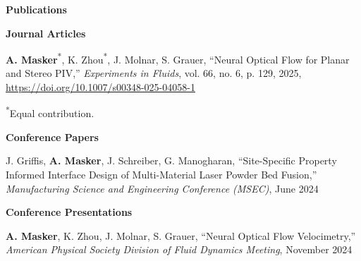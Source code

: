 \begin{center}
    \textbf{Publications}
\end{center}

\vspace*{.05in}
\textbf{Journal Articles}\vspace*{.05in}
\renewcommand{\theenumi}{J\arabic{enumi}}
\begin{etaremune}[leftmargin=18.5pt]
    \item \textbf{A. Masker}\textsuperscript{*}, K. Zhou\textsuperscript{*}, J. Molnar, S. Grauer, ``Neural Optical Flow for Planar and Stereo PIV,'' \textit{Experiments in Fluids}, vol. 66, no. 6, p. 129, 2025, \url{https://doi.org/10.1007/s00348-025-04058-1}
\end{etaremune}
{\small \textsuperscript{*}Equal contribution.}

\vspace{12pt}

\textbf{Conference Papers}\vspace*{.05in}
\renewcommand{\theenumi}{C\arabic{enumi}}
\begin{etaremune}[leftmargin=18.5pt]
    \item J. Griffis, \textbf{A. Masker}, J. Schreiber, G. Manogharan, ``Site-Specific Property Informed Interface Design of Multi-Material Laser Powder Bed Fusion,'' \textit{Manufacturing Science and Engineering Conference (MSEC)}, June 2024
\end{etaremune}

\vspace{12pt}

\textbf{Conference Presentations}\vspace*{.05in}
\renewcommand{\theenumi}{P\arabic{enumi}}
\begin{etaremune}[leftmargin=18.5pt]
    \item \textbf{A. Masker}, K. Zhou, J. Molnar, S. Grauer, ``Neural Optical Flow Velocimetry,'' \textit{American Physical Society Division of Fluid Dynamics Meeting}, November 2024
\end{etaremune}
